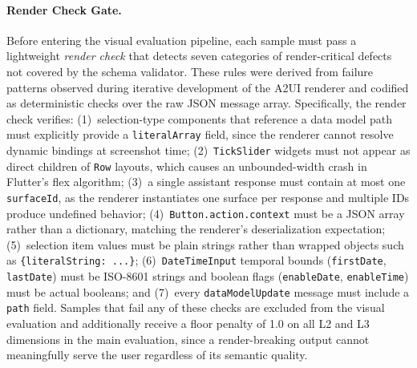\paragraph{Render Check Gate.}
Before entering the visual evaluation pipeline, each sample must pass a lightweight \emph{render check} that detects seven categories of render-critical defects not covered by the schema validator. These rules were derived from failure patterns observed during iterative development of the A2UI renderer and codified as deterministic checks over the raw JSON message array. Specifically, the render check verifies: (1)~selection-type components that reference a data model path must explicitly provide a \texttt{literalArray} field, since the renderer cannot resolve dynamic bindings at screenshot time; (2)~\texttt{TickSlider} widgets must not appear as direct children of \texttt{Row} layouts, which causes an unbounded-width crash in Flutter's flex algorithm; (3)~a single assistant response must contain at most one \texttt{surfaceId}, as the renderer instantiates one surface per response and multiple IDs produce undefined behavior; (4)~\texttt{Button.action.context} must be a JSON array rather than a dictionary, matching the renderer's deserialization expectation; (5)~selection item values must be plain strings rather than wrapped objects such as \texttt{\{literalString: ...\}}; (6)~\texttt{DateTimeInput} temporal bounds (\texttt{firstDate}, \texttt{lastDate}) must be ISO-8601 strings and boolean flags (\texttt{enableDate}, \texttt{enableTime}) must be actual booleans; and (7)~every \texttt{dataModelUpdate} message must include a \texttt{path} field. Samples that fail any of these checks are excluded from the visual evaluation and additionally receive a floor penalty of 1.0 on all L2 and L3 dimensions in the main evaluation, since a render-breaking output cannot meaningfully serve the user regardless of its semantic quality.

